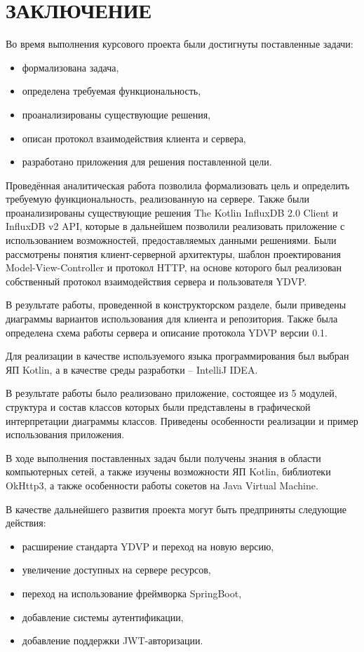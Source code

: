 \section*{ЗАКЛЮЧЕНИЕ}

Во время выполнения курсового проекта были достигнуты поставленные задачи:
\begin{itemize}
\item формализована задача,
\item определена требуемая функциональность,
\item проанализированы существующие решения,
\item описан протокол взаимодействия клиента и сервера,
\item разработано приложения для решения поставленной цели.
\end{itemize}

Проведённая аналитическая работа позволила формализовать цель и определить требуемую функциональность, реализованную на сервере. Также были проанализированы существующие решения The Kotlin InfluxDB 2.0 Client и InfluxDB v2 API, которые в дальнейшем позволили реализовать приложение с использованием возможностей, предоставляемых данными решениями. Были рассмотрены понятия клиент-серверной архитектуры, шаблон проектирования Model-View-Controller и протокол HTTP, на основе которого был реализован собственный протокол взаимодействия сервера и пользователя YDVP.

В результате работы, проведенной в конструкторском разделе, были приведены диаграммы вариантов использования для клиента и репозитория. Также была определена схема работы сервера и описание протокола YDVP версии 0.1.

Для реализации в качестве используемого языка программирования был выбран ЯП Kotlin, а в качестве среды разработки -- IntelliJ IDEA.

В результате работы было реализовано приложение, состоящее из 5 модулей, структура и состав классов которых были представлены в графической интерпретации диаграммы классов. Приведены особенности реализации и пример использования приложения.

В ходе выполнения поставленных задач были получены знания в области компьютерных сетей, а также изучены возможности ЯП Kotlin, библиотеки OkHttp3, а также особенности работы сокетов на Java Virtual Machine.

В качестве дальнейшего развития проекта могут быть предприняты следующие действия:
\begin{itemize}
\item расширение стандарта YDVP и переход на новую версию,
\item увеличение доступных на сервере ресурсов,
\item переход на использование фреймворка SpringBoot,
\item добавление системы аутентификации,
\item добавление поддержки JWT-авторизации.
\end{itemize}

\pagebreak